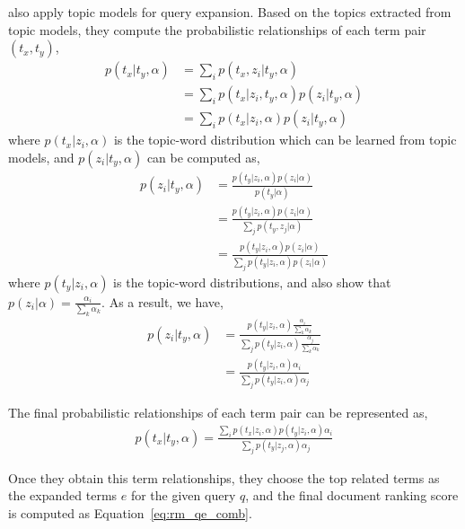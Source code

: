 \cite{Park-2009} also apply topic models for query expansion. Based on the topics extracted from topic models, they compute the probabilistic relationships of each term pair $(t_x, t_y)$, 
\begin{align}
p(t_x|t_y, \alpha) &= \sum_i p(t_x, z_i | t_y, \alpha) \\
&= \sum_i p(t_x | z_i, t_y, \alpha) p(z_i | t_y, \alpha) \\
&= \sum_i p(t_x|z_i, \alpha) p(z_i|t_y, \alpha)
\end{align}
where $p(t_x|z_i, \alpha)$ is the topic-word distribution which can be learned from topic models, and $p(z_i|t_y, \alpha)$ can be computed as,
\begin{align}
p(z_i|t_y, \alpha) &= \frac{p(t_y|z_i,\alpha)p(z_i|\alpha)}{p(t_y|\alpha)} \\
&= \frac{p(t_y|z_i,\alpha)p(z_i|\alpha)}{\sum_j p(t_y, z_j|\alpha)} \\
&= \frac{p(t_y|z_i,\alpha)p(z_i|\alpha)}{\sum_j p(t_y|z_i,\alpha)p(z_i|\alpha)}
\end{align}
where $p(t_y|z_i,\alpha)$ is the topic-word distributions, and \cite{Park-2009} also show that $p(z_i|\alpha) = \frac{\alpha_i}{\sum_k \alpha_k}$. 
As a result, we have,
\begin{align}
p(z_i|t_y, \alpha) &= \frac{p(t_y|z_i,\alpha) \frac{\alpha_i}{\sum_k \alpha_k} }{\sum_j p(t_y|z_i,\alpha) \frac{\alpha_j}{\sum_k \alpha_k}} \\
&= \frac{p(t_y|z_i,\alpha) \alpha_i}{\sum_j p(t_y|z_i,\alpha) \alpha_j}
\end{align}

The final probabilistic relationships of each term pair  can be represented as,
\begin{align}
p(t_x|t_y, \alpha) = \frac{\sum_i p(t_x|z_i, \alpha) p(t_y|z_i,\alpha) \alpha_i }{\sum_j p(t_y|z_j,\alpha) \alpha_j}
\end{align}

Once they obtain this term relationships, they choose the top related terms as the expanded terms $e$ for the given query $q$, and the final document ranking score is computed as Equation~\ref{eq:rm_qe_comb}.

